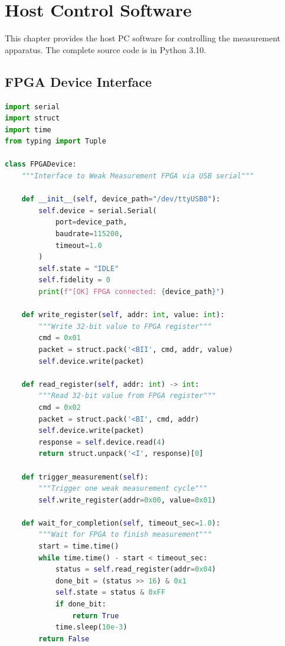 \documentclass[11pt,a4paper,openany]{book}
\begin{document}
\chapter{Host Control Software}\label{ch:software}

This chapter provides the host PC software for controlling the measurement apparatus. The complete source code is in Python 3.10.

\section{FPGA Device Interface}

\begin{lstlisting}[language=Python,caption={FPGADevice class --- serial interface to Zedboard}]
import serial
import struct
import time
from typing import Tuple

class FPGADevice:
    """Interface to Weak Measurement FPGA via USB serial"""

    def __init__(self, device_path="/dev/ttyUSB0"):
        self.device = serial.Serial(
            port=device_path,
            baudrate=115200,
            timeout=1.0
        )
        self.state = "IDLE"
        self.fidelity = 0
        print(f"[OK] FPGA connected: {device_path}")

    def write_register(self, addr: int, value: int):
        """Write 32-bit value to FPGA register"""
        cmd = 0x01
        packet = struct.pack('<BII', cmd, addr, value)
        self.device.write(packet)

    def read_register(self, addr: int) -> int:
        """Read 32-bit value from FPGA register"""
        cmd = 0x02
        packet = struct.pack('<BI', cmd, addr)
        self.device.write(packet)
        response = self.device.read(4)
        return struct.unpack('<I', response)[0]

    def trigger_measurement(self):
        """Trigger one weak measurement cycle"""
        self.write_register(addr=0x00, value=0x01)

    def wait_for_completion(self, timeout_sec=1.0):
        """Wait for FPGA to finish measurement"""
        start = time.time()
        while time.time() - start < timeout_sec:
            status = self.read_register(addr=0x04)
            done_bit = (status >> 16) & 0x1
            self.state = status & 0xFF
            if done_bit:
                return True
            time.sleep(10e-3)
        return False


\end{lstlisting}
\end{document}
